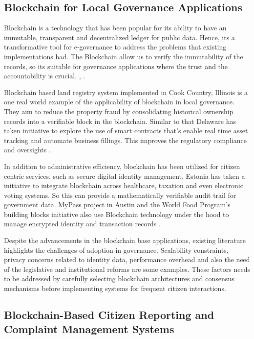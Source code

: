 \subsection{Blockchain for Local Governance Applications}

Blockchain is a technology that has been popular for its ability to have an immutable, transparent and decentralized ledger for public data. Hence, its a transformative tool for e-governance to address the problems that existing implementations had. The Blockchain allow us to verify the immutability of the records, so its suitable for governance applications where the trust and the accountability is crucial. \cite{hamill2018blockchain}, \cite{goswami2020egovernance}.

Blockchain based land registry system implemented in Cook Country, Illinois is a one real world example of the applicability of blockchain in local governance. They aim to reduce the property fraud by consolidating historical ownership records into a verifiable block in the blockchain. Similar to that Delaware has taken initiative to explore the use of smart contracts that's enable real time asset tracking and automate business fillings. This improves the regulatory compliance and oversights \cite{goswami2020egovernance}.

In addition to administrative efficiency, blockchain has been utilized for citizen centric services, such as secure digital identity management. Estonia has taken a initiative to integrate blockchain across healthcare, taxation and even electronic voting systems. So this can provide a mathematically verifiable audit trail for government data. MyPass project in Austin and the World Food Program's building blocks initiative also use Blockchain technology under the hood to manage encrypted identity and transaction records \cite{hamill2018blockchain}.

Despite the advancements in the blockchain base applications, existing literature highlights the challenges of adoption in governance. Scalability constraints, privacy concerns related to identity data, performance overhead and also the need of the legislative and institutional reforms are  some examples. These factors needs to be addressed by carefully selecting blockchain architectures and consensus mechanisms before implementing systems for frequent citizen interactions.

\subsection{Blockchain-Based Citizen Reporting and Complaint Management Systems}


